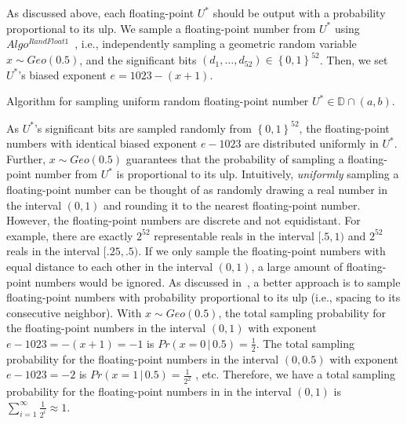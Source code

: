 As discussed above, each floating-point $U^{*}$ should be output with a probability proportional to its ulp. We sample a floating-point number from $U^{*}$ using $Algo^{RandFloat1}$~\cite{walker1974fast,mironov2012significance}, i.e., independently sampling a geometric random variable $x \sim Geo\left(0.5\right) $, and the significant bits $\left(d_{1},\ldots ,d_{52}\right)\in\left\{0,1\right\}^{52} $. Then, we set $U^{*}$'s biased exponent $e=1023-\left(x+1\right) $.

\begin{algorithm}[tbh!]
    \centering
    \caption{Algorithm for sampling uniform random floating-point number $U^{*}\in\mathbb{D} \cap \left(a,b\right) $.}
    \label{algo:RandFloat1}
\end{algorithm}
\FloatBarrier

As $U^{*}$'s significant bits are sampled randomly from $\left\{0,1\right\}^{52} $, the floating-point numbers with identical biased exponent $e-1023$ are distributed uniformly in $U^{*}$.
Further, $x \sim Geo\left(0.5\right) $ guarantees that the probability of sampling a floating-point number from $U^{*}$ is proportional to its ulp.
Intuitively, \textit{uniformly} sampling a floating-point number can be thought of as randomly drawing a real number in the interval $\left(0,1\right) $ and rounding it to the nearest floating-point number. However, the floating-point numbers are discrete and not equidistant. For example, there are exactly $2^{52}$ representable reals in the interval $[.5, 1)$ and $2^{52}$ reals in the interval $[ .25, .5)$. If we only sample the floating-point numbers with equal distance to each other in the interval $\left(0,1\right) $, a large amount of floating-point numbers would be ignored. As discussed in~\cite{walker1974fast,mironov2012significance}, a better approach is to sample floating-point numbers with probability proportional to its ulp (i.e., spacing to its consecutive neighbor).
With $x\sim Geo\left(0.5\right) $, the total sampling probability for the floating-point numbers in the interval $(0,1)$ with exponent $e-1023=-\left(x+1\right) =-1$ is $Pr\left(x=0 \,|\,0.5\right) =\frac{1}{2}$.
The total sampling probability for the floating-point numbers in the interval $(0,0.5)$ with exponent $e-1023=-2$ is $Pr\left(x=1\,|\,0.5\right) =\frac{1}{2^2}$ , etc.
Therefore, we have a total sampling probability for the floating-point numbers in in the interval $\left(0,1\right)$ is $\sum_{i = 1}^{\infty}\frac{1}{2^{i}}\approx 1$.


